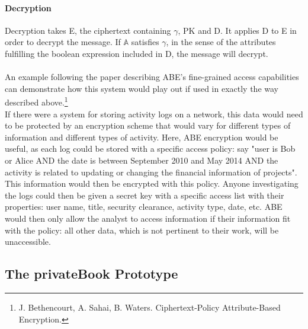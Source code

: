 \documentclass[12pt]{article}
\begin{document}
\paragraph{Decryption}
Decryption takes E, the ciphertext containing $\gamma$, PK and D. It applies D to E in order to decrypt the message. If $\mathbb{A}$ satisfies $\gamma$, in the sense of the attributes fulfilling the boolean expression included in D, the message will decrypt.
\\\\
An example following the paper describing ABE's fine-grained access capabilities can demonstrate how this system would play out if used in exactly the way described above.\footnote{J. Bethencourt, A. Sahai, B. Waters. Ciphertext-Policy Attribute-Based Encryption.} \\
If there were a system for storing activity logs on a network, this data would need to be protected by an encryption scheme that would vary for different types of information and different types of activity. Here, ABE encryption would be useful, as each log could be stored with a specific access policy: say "user is Bob or Alice AND the date is between September 2010 and May 2014 AND the activity is related to updating or changing the financial information of projects". This information would then be encrypted with this policy. Anyone investigating the logs could then be given a secret key with a specific access list with their properties: user name, title, security clearance, activity type, date, etc.  ABE would then only allow the analyst to access information if their information fit with the policy: all other data, which is not pertinent to their work, will be unaccessible.

\subsection{The privateBook Prototype}
\end{document}
